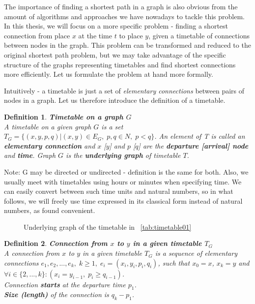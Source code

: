 \documentclass[a4paper]{article}
\newcommand{\inputTikZ}[1]{%
  }
\newcommand{\inputTikZ}[1]{%
    \beginpgfgraphicnamed{#1-external}%
    \endpgfgraphicnamed%
  }
\newtheorem{definition}{Definition}
\begin{document}

    The importance of finding a shortest path in a graph is also obvious from the amount of algorithms and approaches we have nowadays to tackle this problem. In this thesis, we will focus on a more specific problem - finding a shortest connection from place $x$ at the time $t$ to place $y$, given a timetable of connections between nodes in the graph. This problem can be transformed and reduced to the original shortest path problem, but we may take advantage of the specific structure of the graphs representing timetables and find shortest connections more efficiently. Let us formulate the problem at hand more formally.

    Intuitively - a timetable is just a set of \emph{elementary connections} between pairs of nodes in a graph. Let us therefore introduce the definition of a timetable.\\

    \begin{definition}
        \textbf{Timetable on a graph $G$} \\
        A timetable on a given graph $G$ is a set $T_{G} = \{(x, y, p, q)|(x, y) \in E_{G}, \; p, q \in N, \; p < q \}$. An element of T is called an \textbf{elementary connection} and $x$ [$y$] and $p$ [$q$] are the \textbf{departure [arrival] node} and \textbf{time}. Graph $G$ is the \textbf{underlying graph} of timetable $T$.
    \end{definition}

    \noindent Note: G may be directed or undirected - definition is the same for both. Also, we usually meet with timetables using hours or minutes when specifying time. We can easily convert between such time units and natural numbers, so in what follows, we will freely use time expressed in its classical form instead of natural numbers, as found convenient.

    \begin{figure}[h!]
        \begin{center}
            \inputTikZ{./tikzpics/basegraph}
        \end{center}
        \caption{\label{fig:underlying01} Underlying graph of the timetable in ~\ref{tab:timetable01}}
    \end{figure}

    \begin{definition}
        \textbf{Connection from $x$ to $y$ in a given timetable $T_{G}$} \\
        A connection from $x$ to $y$ in a given timetable $T_{G}$ is a sequence of \emph{elementary connections} $e_{1}, e_{2}, ..., e_{k}, \; k \geq 1, \; e_{i} = (x_{i}, y_{i}, p_{i}, q_{i})$, such that $x_{0} = x$, $x_{k} = y$ and $\forall i \in \{2, ..., k\}: (x_{i} = y_{i - 1}, \; p_{i} \geq q_{i - 1})$. \\
        \noindent Connection \textbf{starts} at the \emph{departure time} $p_{1}$. \\
        \noindent \textbf{Size (length)} of the connection is $q_{k} - p_{1}$.
    \end{definition}
\end{document}
